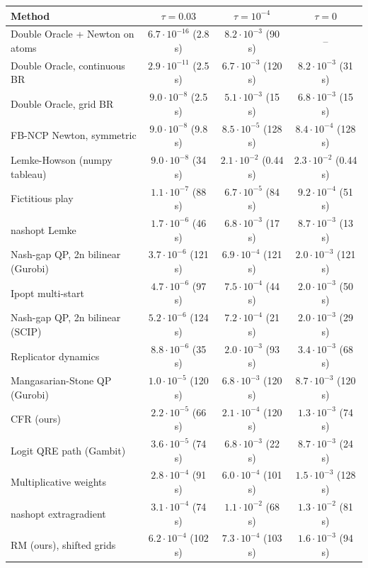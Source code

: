 \begin{tabular}{lccc}
\toprule
Method & $\tau=0.03$ & $\tau=10^{-4}$ & $\tau=0$ \\
\midrule
Double Oracle + Newton on atoms & $6.7\cdot10^{-16}$ (2.8 s) & $8.2\cdot10^{-3}$ (90 s) & -- \\
Double Oracle, continuous BR & $2.9\cdot10^{-11}$ (2.5 s) & $6.7\cdot10^{-3}$ (120 s) & $8.2\cdot10^{-3}$ (31 s) \\
Double Oracle, grid BR & $9.0\cdot10^{-8}$ (2.5 s) & $5.1\cdot10^{-3}$ (15 s) & $6.8\cdot10^{-3}$ (15 s) \\
FB-NCP Newton, symmetric & $9.0\cdot10^{-8}$ (9.8 s) & $8.5\cdot10^{-5}$ (128 s) & $8.4\cdot10^{-4}$ (128 s) \\
Lemke-Howson (numpy tableau) & $9.0\cdot10^{-8}$ (34 s) & $2.1\cdot10^{-2}$ (0.44 s) & $2.3\cdot10^{-2}$ (0.44 s) \\
Fictitious play & $1.1\cdot10^{-7}$ (88 s) & $6.7\cdot10^{-5}$ (84 s) & $9.2\cdot10^{-4}$ (51 s) \\
nashopt Lemke & $1.7\cdot10^{-6}$ (46 s) & $6.8\cdot10^{-3}$ (17 s) & $8.7\cdot10^{-3}$ (13 s) \\
Nash-gap QP, 2n bilinear (Gurobi) & $3.7\cdot10^{-6}$ (121 s) & $6.9\cdot10^{-4}$ (121 s) & $2.0\cdot10^{-3}$ (121 s) \\
Ipopt multi-start & $4.7\cdot10^{-6}$ (97 s) & $7.5\cdot10^{-4}$ (44 s) & $2.0\cdot10^{-3}$ (50 s) \\
Nash-gap QP, 2n bilinear (SCIP) & $5.2\cdot10^{-6}$ (124 s) & $7.2\cdot10^{-4}$ (21 s) & $2.0\cdot10^{-3}$ (29 s) \\
Replicator dynamics & $8.8\cdot10^{-6}$ (35 s) & $2.0\cdot10^{-3}$ (93 s) & $3.4\cdot10^{-3}$ (68 s) \\
Mangasarian-Stone QP (Gurobi) & $1.0\cdot10^{-5}$ (120 s) & $6.8\cdot10^{-3}$ (120 s) & $8.7\cdot10^{-3}$ (120 s) \\
CFR (ours) & $2.2\cdot10^{-5}$ (66 s) & $2.1\cdot10^{-4}$ (120 s) & $1.3\cdot10^{-3}$ (74 s) \\
Logit QRE path (Gambit) & $3.6\cdot10^{-5}$ (74 s) & $6.8\cdot10^{-3}$ (22 s) & $8.7\cdot10^{-3}$ (24 s) \\
Multiplicative weights & $2.8\cdot10^{-4}$ (91 s) & $6.0\cdot10^{-4}$ (101 s) & $1.5\cdot10^{-3}$ (128 s) \\
nashopt extragradient & $3.1\cdot10^{-4}$ (74 s) & $1.1\cdot10^{-2}$ (68 s) & $1.3\cdot10^{-2}$ (81 s) \\
RM (ours), shifted grids & $6.2\cdot10^{-4}$ (102 s) & $7.3\cdot10^{-4}$ (103 s) & $1.6\cdot10^{-3}$ (94 s) \\

\end{tabular}
